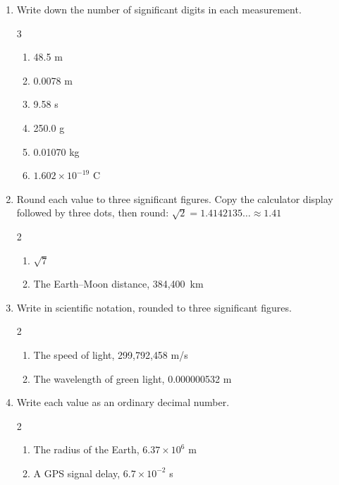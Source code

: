 \documentclass[12pt, twoside]{article}
\begin{document}
\begin{enumerate}[itemsep=0.5cm]

\item Write down the number of significant digits in each measurement.
  \begin{multicols}{3}
    \begin{enumerate}[itemsep=0.4cm]
      \item 48.5 m
      \item 0.0078 m
      \item 9.58 s
      \item 250.0 g
      \item 0.01070 kg
      \item $1.602 \times 10^{-19}$ C
    \end{enumerate}
  \end{multicols} \vspace{0.5cm}

\item Round each value to three significant figures. Copy the calculator display
  followed by three dots, then round: $\sqrt{2} = 1.4142135\ldots \approx 1.41$
  \begin{multicols}{2}
    \raggedright
    \begin{enumerate}[itemsep=1.3cm]
      \item $\sqrt{7}$
      \item The Earth--Moon distance, 384{,}400~km
    \end{enumerate}
  \end{multicols} \vspace{1.2cm}

\item Write in scientific notation, rounded to three significant figures.
  \begin{multicols}{2}
    \raggedright
    \begin{enumerate}[itemsep=1.3cm]
      \item The speed of light, 299{,}792{,}458 m/s
      \item The wavelength of green light, 0.000000532 m
    \end{enumerate}
  \end{multicols} \vspace{1.2cm}

\item Write each value as an ordinary decimal number.
  \begin{multicols}{2}
    \raggedright
    \begin{enumerate}[itemsep=1.3cm]
      \item The radius of the Earth, $6.37 \times 10^{6}$ m
      \item A GPS signal delay, $6.7 \times 10^{-2}$ s
    \end{enumerate}
  \end{multicols}


\end{enumerate}
\end{document}
